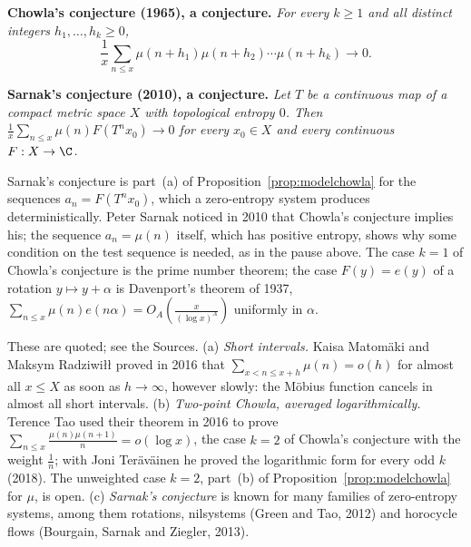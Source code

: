 \medskip\noindent\textbf{Chowla's conjecture (1965), a conjecture.} \emph{For every $k\ge1$ and all distinct integers $h_1,\dots,h_k\ge0$,
\[
\frac1x\sum_{n\le x}\mu(n+h_1)\mu(n+h_2)\cdots\mu(n+h_k)\longrightarrow0.
\]}

\medskip\noindent\textbf{Sarnak's conjecture (2010), a conjecture.} \emph{Let $T$ be a continuous map of a compact metric space $X$ with topological entropy $0$. Then $\frac1x\sum_{n\le x}\mu(n)F(T^nx_0)\to0$ for every $x_0\in X$ and every continuous $F:X\to\C$.}

\medskip
Sarnak's conjecture is part~(a) of Proposition~\ref{prop:modelchowla} for the sequences $a_n=F(T^nx_0)$, which a zero-entropy system produces deterministically. Peter Sarnak noticed in 2010 that Chowla's conjecture implies his; the sequence $a_n=\mu(n)$ itself, which has positive entropy, shows why some condition on the test sequence is needed, as in the pause above. The case $k=1$ of Chowla's conjecture is the prime number theorem; the case $F(y)=e(y)$ of a rotation $y\mapsto y+\alpha$ is Davenport's theorem of 1937, $\sum_{n\le x}\mu(n)e(n\alpha)=O_A(\frac x{(\log x)^A})$ uniformly in $\alpha$.

\begin{remark}
These are quoted; see the Sources. (a) \emph{Short intervals.} Kaisa Matom\"aki and Maksym Radziwi\l\l{} proved in 2016 that $\sum_{x<n\le x+h}\mu(n)=o(h)$ for almost all $x\le X$ as soon as $h\to\infty$, however slowly: the M\"obius function cancels in almost all short intervals. (b) \emph{Two-point Chowla, averaged logarithmically.} Terence Tao used their theorem in 2016 to prove $\sum_{n\le x}\frac{\mu(n)\mu(n+1)}n=o(\log x)$, the case $k=2$ of Chowla's conjecture with the weight $\frac1n$; with Joni Ter\"av\"ainen he proved the logarithmic form for every odd $k$ (2018). The unweighted case $k=2$, part~(b) of Proposition~\ref{prop:modelchowla} for $\mu$, is open. (c) \emph{Sarnak's conjecture} is known for many families of zero-entropy systems, among them rotations, nilsystems (Green and Tao, 2012) and horocycle flows (Bourgain, Sarnak and Ziegler, 2013).
\end{remark}

